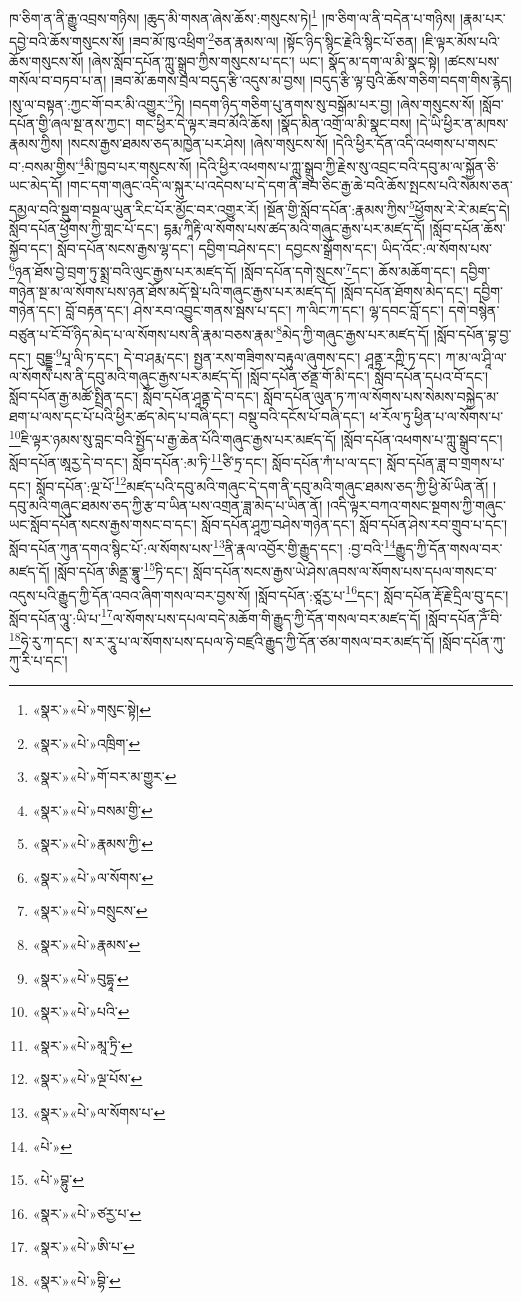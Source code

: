 ཁ་ཅིག་ན་ནི་རྒྱུ་འབྲས་གཉིས། །ཆུད་མི་གསན་ཞེས་ཆོས་:གསུངས་ཏེ།\footnote{«སྣར་»«པེ་»གསུང་སྟེ།} །ཁ་ཅིག་ལ་ནི་བདེན་པ་གཉིས། །རྣམ་པར་དབྱེ་བའི་ཆོས་གསུངས་སོ། །ཟབ་མོ་ཁུ་འཕྲིག་\footnote{«སྣར་»«པེ་»འཁྲིག་}ཅན་རྣམས་ལ། །སྟོང་ཉིད་སྙིང་རྗེའི་སྙིང་པོ་ཅན། །ཇི་ལྟར་མོས་པའི་ཆོས་གསུངས་སོ། །ཞེས་སློབ་དཔོན་ཀླུ་སྒྲུབ་ཀྱིས་གསུངས་པ་དང་། ཡང་། སྣོད་མ་དག་ལ་མི་སྣང་སྟེ། །ཚངས་པས་གསོལ་བ་བཏབ་པ་ན། །ཟབ་མོ་ཆགས་བྲལ་བདུད་རྩི་འདུས་མ་བྱས། །བདུད་རྩི་ལྟ་བུའི་ཆོས་གཅིག་བདག་གིས་རྙེད། །སུ་ལ་བསྟན་:ཀྱང་གོ་བར་མི་འགྱུར་\footnote{«སྣར་»«པེ་»གོ་བར་མ་གྱུར་}ཏེ། །བདག་ཉིད་གཅིག་པུ་ནགས་སུ་བསྒོམ་པར་བྱ། །ཞེས་གསུངས་སོ། །སློབ་དཔོན་གྱི་ཞལ་སྔ་ནས་ཀྱང་། གང་ཕྱིར་དེ་ལྟར་ཟབ་མོའི་ཆོས། །སྣོད་མིན་འགྲོ་ལ་མི་སྣང་བས། །དེ་ཡི་ཕྱིར་ན་མཁས་རྣམས་ཀྱིས། །སངས་རྒྱས་ཐམས་ཅད་མཁྱེན་པར་ཤེས། །ཞེས་གསུངས་སོ། །དེའི་ཕྱིར་དོན་འདི་འཕགས་པ་གསང་བ་:བསམ་གྱིས་\footnote{«སྣར་»«པེ་»བསམ་གྱི་}མི་ཁྱབ་པར་གསུངས་སོ། །དེའི་ཕྱིར་འཕགས་པ་ཀླུ་སྒྲུབ་ཀྱི་རྗེས་སུ་འབྲང་བའི་དབུ་མ་ལ་སྐྱོན་ཅི་ཡང་མེད་དོ། །གང་དག་གཞུང་འདི་ལ་སྐུར་པ་འདེབས་པ་དེ་དག་ནི་ཟབ་ཅིང་རྒྱ་ཆེ་བའི་ཆོས་སྤངས་པའི་སེམས་ཅན་དམྱལ་བའི་སྡུག་བསྔལ་ཡུན་རིང་པོར་མྱོང་བར་འགྱུར་རོ། །སྔོན་གྱི་སློབ་དཔོན་:རྣམས་ཀྱིས་\footnote{«སྣར་»«པེ་»རྣམས་ཀྱི་}ཕྱོགས་རེ་རེ་མཛད་དེ། སློབ་དཔོན་ཕྱོགས་ཀྱི་གླང་པོ་དང་། དྷརྨ་ཀཱིརྟི་ལ་སོགས་པས་ཚད་མའི་གཞུང་རྒྱས་པར་མཛད་དོ། །སློབ་དཔོན་ཆོས་སྐྱོབ་དང་། སློབ་དཔོན་སངས་རྒྱས་ལྷ་དང་། དབྱིག་བཤེས་དང་། དབྱངས་སྒྲོགས་དང་། ཡིད་འོང་:ལ་སོགས་པས་\footnote{«སྣར་»«པེ་»ལ་སོགས་}ཉན་ཐོས་བྱེ་བྲག་ཏུ་སྨྲ་བའི་ལུང་རྒྱས་པར་མཛད་དོ། །སློབ་དཔོན་དགེ་སྲུངས་\footnote{«སྣར་»«པེ་»བསྲུངས་}དང་། ཆོས་མཆོག་དང་། དབྱིག་གཉེན་སྔ་མ་ལ་སོགས་པས་ཉན་ཐོས་མདོ་སྡེ་པའི་གཞུང་རྒྱས་པར་མཛད་དོ། །སློབ་དཔོན་ཐོགས་མེད་དང་། དབྱིག་གཉེན་དང་། བློ་བརྟན་དང་། ཤེས་རབ་འབྱུང་གནས་སྦས་པ་དང་། ཀ་ལིང་ཀ་དང་། ལྷ་དབང་བློ་དང་། དགེ་བསྙེན་བཙུན་པ་ངོ་བོ་ཉིད་མེད་པ་ལ་སོགས་པས་ནི་རྣམ་བཅས་རྣམ་\footnote{«སྣར་»«པེ་»རྣམས་}མེད་ཀྱི་གཞུང་རྒྱས་པར་མཛད་དོ། །སློབ་དཔོན་བྷ་བྱ་དང་། བུདྡྷ་\footnote{«སྣར་»«པེ་»བུདྷཱ་}པཱ་ལི་ཏ་དང་། དེ་བ་ཤརྨ་དང་། སྤྱན་རས་གཟིགས་བརྟུལ་ཞུགས་དང་། ཤཱནྟ་རཀྵི་ཏ་དང་། ཀ་མ་ལ་ཤཱི་ལ་ལ་སོགས་པས་ནི་དབུ་མའི་གཞུང་རྒྱས་པར་མཛད་དོ། །སློབ་དཔོན་ཙནྡྲ་གོ་མི་དང་། སློབ་དཔོན་དཔའ་བོ་དང་། སློབ་དཔོན་རྒྱ་མཚོ་སྤྲིན་དང་། སློབ་དཔོན་ཤཱནྟ་དེ་བ་དང་། སློབ་དཔོན་ལུན་ཏ་ཀ་ལ་སོགས་པས་སེམས་བསྐྱེད་མ་ཐག་པ་ལས་དང་པོ་པའི་ཕྱིར་ཚད་མེད་པ་བཞི་དང་། བསྡུ་བའི་དངོས་པོ་བཞི་དང་། ཕ་རོལ་ཏུ་ཕྱིན་པ་ལ་སོགས་པ་\footnote{«སྣར་»«པེ་»པའི་}ཇི་ལྟར་ཉམས་སུ་བླང་བའི་སྤྱོད་པ་རྒྱ་ཆེན་པོའི་གཞུང་རྒྱས་པར་མཛད་དོ། །སློབ་དཔོན་འཕགས་པ་ཀླུ་སྒྲུབ་དང་། སློབ་དཔོན་ཨཱརྱ་དེ་བ་དང་། སློབ་དཔོན་:མ་ཏི་\footnote{«སྣར་»«པེ་»མཱ་ཏྲི་}ཙི་ཏྲ་དང་། སློབ་དཔོན་ཀཾ་པ་ལ་དང་། སློབ་དཔོན་ཟླ་བ་གྲགས་པ་དང་། སློབ་དཔོན་:ལྔ་པོ་\footnote{«སྣར་»«པེ་»ལྔ་པོས་}མཛད་པའི་དབུ་མའི་གཞུང་དེ་དག་ནི་དབུ་མའི་གཞུང་ཐམས་ཅད་ཀྱི་ཕྱི་མོ་ཡིན་ནོ། །དབུ་མའི་གཞུང་ཐམས་ཅད་ཀྱི་རྩ་བ་ཡིན་པས་འགྲན་ཟླ་མེད་པ་ཡིན་ནོ། །འདི་ལྟར་བཀའ་གསང་སྔགས་ཀྱི་གཞུང་ཡང་སློབ་དཔོན་སངས་རྒྱས་གསང་བ་དང་། སློབ་དཔོན་ཤཱཀྱ་བཤེས་གཉེན་དང་། སློབ་དཔོན་ཤེས་རབ་གྲུབ་པ་དང་། སློབ་དཔོན་ཀུན་དགའ་སྙིང་པོ་:ལ་སོགས་པས་\footnote{«སྣར་»«པེ་»ལ་སོགས་པ་}ནི་རྣལ་འབྱོར་གྱི་རྒྱུད་དང་། :བྱ་བའི་\footnote{«པེ་»}རྒྱུད་ཀྱི་དོན་གསལ་བར་མཛད་དོ། །སློབ་དཔོན་ཨིནྡྲ་བྷཱུ་\footnote{«པེ་»བྷུ་}ཏི་དང་། སློབ་དཔོན་སངས་རྒྱས་ཡེ་ཤེས་ཞབས་ལ་སོགས་པས་དཔལ་གསང་བ་འདུས་པའི་རྒྱུད་ཀྱི་དོན་འབའ་ཞིག་གསལ་བར་བྱས་སོ། །སློབ་དཔོན་:ཙཱརྱ་པ་\footnote{«སྣར་»«པེ་»ཙརྱ་པ་}དང་། སློབ་དཔོན་རྡོ་རྗེ་དྲིལ་བུ་དང་། སློབ་དཔོན་ལཱུ་:ཡི་པ་\footnote{«སྣར་»«པེ་»ཨི་པ་}ལ་སོགས་པས་དཔལ་བདེ་མཆོག་གི་རྒྱུད་ཀྱི་དོན་གསལ་བར་མཛད་དོ། །སློབ་དཔོན་ཌོཾ་བི་\footnote{«སྣར་»«པེ་»བྷི་}ཧེ་རུ་ཀ་དང་། ས་ར་རཱུ་པ་ལ་སོགས་པས་དཔལ་ཧེ་བཛྲའི་རྒྱུད་ཀྱི་དོན་ཙམ་གསལ་བར་མཛད་དོ། །སློབ་དཔོན་ཀུ་ཀུ་རི་པ་དང་། 